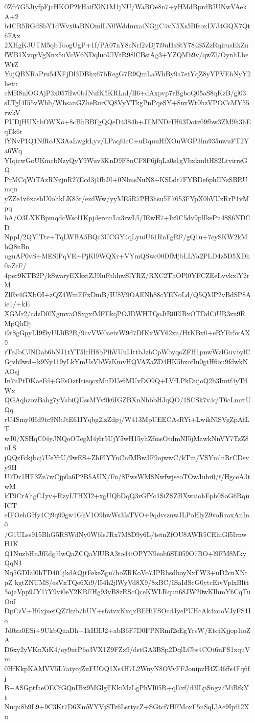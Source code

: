 0Zfr7G5JiyfpFjcHKOP2kHaifXlN1M1jNU/WaBOe8n7+yHMdBprdRIUNwVAekA+2
b4CR5RGdSbY1dWvx0aBNOmlLN0WddmxaiNGjjC4vN5Xs5BfsoxLVJ4GQX7Qt6FAx
2XHgKJUTM5qbToogUgP+1f/PA07nY8cNrf2vDj7i9uHsStY784S5ZzRqirusEkZn
fWB1XvqyVgNnx5uVcW6NDqluoUlVtR98lCBsiAg3+YZQMb9v/qwZl/OynhLbeWtZ
YujQBNRaPru54XFjDl3DBhx67bRegG7R9QmLaWhBy9a7etYqZ8yYPVEbNyY2hetu
cMR8nlOGAjP3x057lIw0bJNufK5KRLnI/lI6+dAxpvp7rBgboQ05aS8qKzB/gl03
sLTgI4I55vWhb/WhsanGZheRurCQ8VyYTkgPnPqeSY+8nvWt0hzVPOCcMY55rwkV
PUDjHUXtbOWXo+8cBhBBFgQQeD4384h+JEMNDcIH63Dotz09fbw3ZM9h3hEqEk6t
lYNvP1Q1NlRcJX3AaLwgkLyv/LPaqf4cC+uDquuHfXOuWGP3lm935uwuFT2Ya6Wq
YIqicwGoUKmcbNzyQyY9Wuv3KnD9F8nCF8F6jfqLa0s1gVbxkmltHS2LtvirrsGQ
PrMCqWiTAzRNzjuR27Ecd3j1fbJ0+0NlmsNuN8+KSLdr7FYBDe6phIlNsSBRUmqn
yZZe4v6xcsbU0ohkLK83r/ezdWw/yyME5R7PH3hsu5E7653FYpX0hVUzRrP1vMpq
bA/O3LXKBpmqdcWsol1KpjdercmLu3rwL5/IEwH7+Ix9C5dv9plIkePu48S6NDCD
NppI/2QYlTte+TqLWBA5BQc3UCGY4qLyuiU61RnFgRF/gQ1u+7cySKW2kMbQ8nBn
uguAP0vS+MESlPqVE+PjKl9WQXr+VYmQSwc00DfMjbLLYa2PLD4z5D5XDh0aZcF/
4per9KTB2P/kSwaryEXkztZJ9luFahhwSlYRZ/RXC2ThOPl0YFCZEeLvvkxlY2rM
ZlEv4GXbOI+zQZ4WmEFxDmB/IU8V9OAENh88cYENoLd/Q5QMP2vBdSP8Aie1/+kE
XGMr2/cdzD0lXgmxaOSxgxfMFEkqPOJDWHTQoJiR0ElBxOTDdCiUR3zn9RMpQhDj
i9r8gGpyLI9f9yUIJiB2R/9cvVW0aeivW9d7DIKxWY62zu/HtKBx0+eRYEr5vAX9
rTeJbCJNDab6bNJ1tYT5IrlH8bPlhVUuIJttbJzhCpWbyqoZFH1pnwWzlGuvbylC
Gjvh9wd+k9Ny119yLkYmUsVbWzKmvHQVAZaZD4HK5bxofIu0gtH6ou9fdwkNAOsj
In7uPtDKaeFd+GFsOztItieqcxMuDUe6MUvDO9Q+LVfLPkDujoQ2b3Imtf4yTdWx
QGAqhzovBahg7yVabiQUssMYv9k6IGZBXnNbbbHJqQO/1SCSk7v4qiT6cLmrtUQq
rU4Smy0Hd9tc9NbJtE61IYqbg2lzZdpj/W413MpUEECAsRYi+LwikNlSVgZpAfLT
wJ0/XSHqC04yJNQoOTegM4j6r5UjY5wH15yhZfmsOtdmNI5jMawkNnVY7TzZ8uLS
jQQzFckjbcj7UeYrU/9wES+ZhFlYYnCnfMBw3F9ojwwC/kTm/VSYmlnRrCDsvy9H
U7Dz1HE3Zn7wCjp0a6P2B5AUX/Fu/8PwsWMSNwfwjseoTOwJubr0/f/HgceA3twM
kT9CrAhgCJyv+RzyLTHXI2+xgUQbDqQ3rGfYo1SiZSZBXwaiohEph0SoG6RquICT
eIFOehGHy4Cj9q90gw1GhV1O9hwWs3IsTVO+9qdvsznwJLPoHlyZ9voRraxAnIn0
/G1ULss915BhG5RSWdNy0W6lsJRx7M8D9y6L/tetnZfOU8AWR5CEhiGf5IrnwH1K
Q1NuzbHuJfEdg7lwQaZCQaYlUBA3to44iOPYN9eob6SE059O7BO+l9FM8MkyQqN1
Nq5GDIal0hTD401jkdAQjtFekeZgu7boZRKoVo7JPRhsdhoyNxFW3+uD2cnXNtpZ
kgtZNUMS/esVxTQe6Xi9/l54h2jlWyVd8X9/8xBC/ISaIdScG0ytcEivVplxBltt
5ojaVpp9JY17Y9vi0eY2KRFHg93yB8zRScQceKWLRqun68JW20wKIhmY6CqTuOuI
DpCzV+H0xjuetQZ7kzb/bUY+sfatvxKxqxBEHiFSOcdJyePUHcAk4xooVJyFS1Io
Jd0za0ESi+9UkbQuaDh+1kHHJ2+abB6F7D0FPNRmf2eEgYcsW/EtqiKjjop1ioZA
D6xy2yVKnXiK4/oy9nrP6o3VX1Z9FZx9/dstGA3BSp2DqlLCbs4COt6nFS1xquVm
0HfKkpKAMVV5L7atyojZuFUOQ1Xs4H7L2WnyN8OVvFFJonipzH4Zl46ffs4Fq6fj
B+ASGptfaeOECfGQnIBx9MGlgFKkiMzLgPhVI05R+ql7zf/d3lLpSngv7MiBfkYt
Nuqu8b9L9+9C3Kt7D6XmWYVjSTz6LsrtycZ+SGtcf7HFMoxF5uSqIJAe9Ipf12Xu
